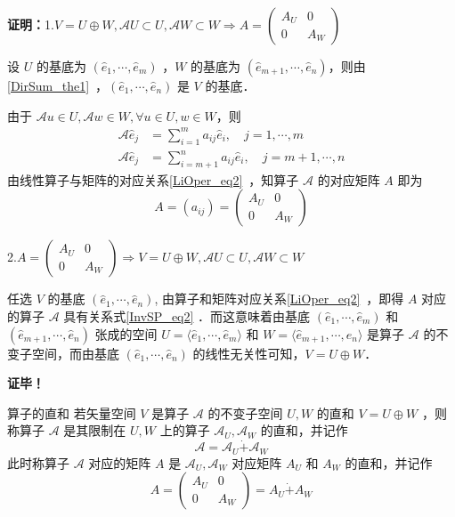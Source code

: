 \textbf{证明：}1.$
V=U\oplus W,\mathcal{A}U\subset U,\mathcal{A}W\subset W\Rightarrow A=\begin{pmatrix}
A_U&0\\
0&A_W
\end{pmatrix}
$

设 $U$ 的基底为 $(\hat e_1,\cdots,\hat e_m)$ ，$W$ 的基底为 $(\hat e_{m+1},\cdots,\hat e_n)$，则由\autoref{DirSum_the1}~，$(\hat e_{1},\cdots,\hat e_n)$ 是 $V$ 的基底．

由于 $\mathcal{A}u\in U, \mathcal{A} w\in W,\forall  u\in U, w\in W$，则
\begin{equation}\label{InvSP_eq2}
\begin{aligned}
\mathcal{A}\hat e_j&=\sum_{i=1}^m a_{ij}\hat e_i,\quad j=1,\cdots ,m\\
\mathcal{A}\hat e_j&=\sum_{i=m+1}^n a_{ij}\hat e_i,\quad j=m+1,\cdots ,n
\end{aligned}
\end{equation}
由线性算子与矩阵的对应关系\autoref{LiOper_eq2}~，知算子 $\mathcal{A}$ 的对应矩阵 $A$ 即为 
\begin{equation}
A=(a_{ij})=\begin{pmatrix}
A_U&0\\
0&A_W
\end{pmatrix}
\end{equation}

2.$
A=\begin{pmatrix}
A_U&0\\
0&A_W
\end{pmatrix}\Rightarrow V=U\oplus W,\mathcal{A}U\subset U,\mathcal{A}W\subset W
$

任选 $V$ 的基底 $(\hat e_1,\cdots,\hat e_n)$, 由算子和矩阵对应关系\autoref{LiOper_eq2}~，即得 $A$ 对应的算子 $\mathcal{A}$ 具有关系式\autoref{InvSP_eq2} ．而这意味着由基底 $(\hat e_1,\cdots,\hat e_m)$ 和 $(\hat e_{m+1},\cdots,\hat e_n)$ 张成的空间 $U=\langle\hat e_1,\cdots,\hat e_m\rangle$ 和 $W=\langle\hat e_{m+1},\cdots,\hat e_n\rangle$ 是算子 $\mathcal{A}$ 的不变子空间，而由基底 $(\hat e_1,\cdots,\hat e_n)$ 的线性无关性可知，$V=U\oplus W$．

\textbf{证毕！}


\begin{definition}{算子的直和}
若矢量空间 $V$ 是算子 $\mathcal{A}$ 的不变子空间 $U,W$ 的直和 $V=U\oplus W$ ，则称算子 $\mathcal{A}$ 是其限制在 $U,W$ 上的算子 $\mathcal{A}_U,\mathcal{A}_W$ 的直和，并记作
\begin{equation}
\mathcal{A}=\mathcal{A}_U\dot{+}\mathcal{A}_W
\end{equation}
此时称算子 $\mathcal{A}$ 对应的矩阵 $A$ 是 $\mathcal{A}_U,\mathcal{A}_W$ 对应矩阵 $A_U$ 和 $A_W$ 的直和，并记作
\begin{equation}
A=\begin{pmatrix}
A_U&0\\
0&A_W
\end{pmatrix}=A_U\dot{+}A_W
\end{equation}

\end{definition}